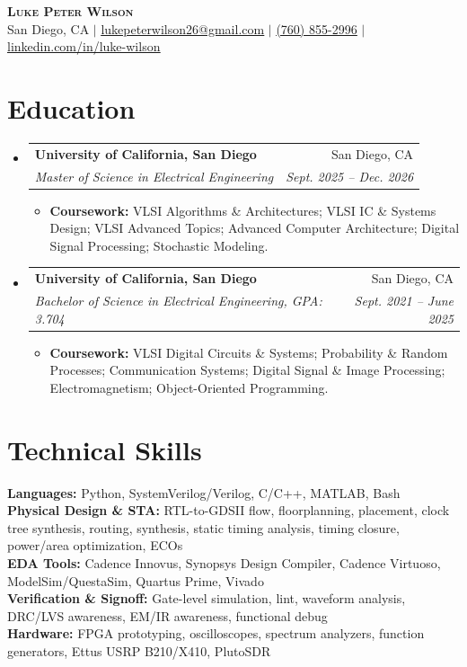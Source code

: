\documentclass[letterpaper,10pt]{article}
\makeatletter
\newcommand{\resumeItem}[1]{\item \small{#1}}
\newcommand{\resumeSubheading}[4]{
  \vspace{1pt}\item
    \begin{tabular*}{0.97\textwidth}[t]{l@{\extracolsep{\fill}}r}
      \textbf{#1} & #2 \\
      \textit{\small #3} & \textit{\small #4} \\
    \end{tabular*}\vspace{-1pt}
}
\newcommand{\resumeItemListStart}{\begin{itemize}[leftmargin=0.18in, itemsep=0pt, topsep=1pt]}
\newcommand{\resumeItemListEnd}{\end{itemize}\vspace{-2pt}}
\newcommand{\resumeSubHeadingListStart}{\begin{itemize}[leftmargin=0.15in, label={}]}
\newcommand{\resumeSubHeadingListEnd}{\end{itemize}\vspace{-1pt}}
\makeatother
\begin{document}
\begin{center}
    \textbf{\Huge \scshape Luke Peter Wilson} \\ \vspace{2pt}
    \small San Diego, CA $|$
    \href{mailto:lukepeterwilson26@gmail.com}{\underline{lukepeterwilson26@gmail.com}} $|$
    \href{tel:+17608552996}{\underline{(760) 855-2996}} $|$
    \href{https://www.linkedin.com/in/luke-wilson-33718b238/}{\underline{linkedin.com/in/luke-wilson}}
\end{center}

\section{Education}
\resumeSubHeadingListStart
  \resumeSubheading
    {University of California, San Diego}{San Diego, CA}
    {Master of Science in Electrical Engineering}{Sept. 2025 -- Dec. 2026}
    \resumeItemListStart
      \resumeItem{\textbf{Coursework:} VLSI Algorithms \& Architectures; VLSI IC \& Systems Design; VLSI Advanced Topics; Advanced Computer Architecture; Digital Signal Processing; Stochastic Modeling.}
    \resumeItemListEnd

  \resumeSubheading
    {University of California, San Diego}{San Diego, CA}
    {Bachelor of Science in Electrical Engineering, GPA: 3.704}{Sept. 2021 -- June 2025}
    \resumeItemListStart
      \resumeItem{\textbf{Coursework:} VLSI Digital Circuits \& Systems; Probability \& Random Processes; Communication Systems; Digital Signal \& Image Processing; Electromagnetism; Object-Oriented Programming.}
    \resumeItemListEnd
\resumeSubHeadingListEnd

\section{Technical Skills}
\begin{itemize}[leftmargin=0.15in, label={}]
  \small{\item{
    \textbf{Languages:} Python, SystemVerilog/Verilog, C/C++, MATLAB, Bash \\
    \textbf{Physical Design \& STA:} RTL-to-GDSII flow, floorplanning, placement, clock tree synthesis, routing, synthesis, static timing analysis, timing closure, power/area optimization, ECOs \\
    \textbf{EDA Tools:} Cadence Innovus, Synopsys Design Compiler, Cadence Virtuoso, ModelSim/QuestaSim, Quartus Prime, Vivado \\
    \textbf{Verification \& Signoff:} Gate-level simulation, lint, waveform analysis, DRC/LVS awareness, EM/IR awareness, functional debug \\
    \textbf{Hardware:} FPGA prototyping, oscilloscopes, spectrum analyzers, function generators, Ettus USRP B210/X410, PlutoSDR
  }}
\end{itemize}
\end{document}
